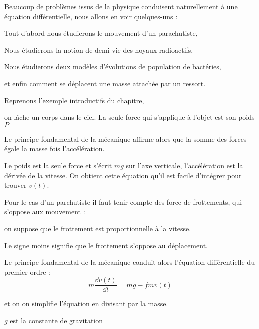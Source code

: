 







\debuttexte


\diapo

Beaucoup de problèmes issus de la physique conduisent 
naturellement à une équation différentielle, nous allons
en voir quelques-uns :

\change

\change
Tout d'abord nous étudierons le mouvement d'un parachutiste,

\change
Nous étudierons la notion de demi-vie des noyaux radioactifs,

\change
Nous étudierons deux modèles d'évolutions de population de bactéries,

\change
et enfin comment se déplacent une masse attachée par un ressort.


\diapo

Reprenons l'exemple introductifs du chapitre,

on lâche un corps dans le ciel.
La seule force qui s'applique à l'objet est son poids $P$

\change
Le principe fondamental de la mécanique affirme alors que 
la somme des forces égale la masse fois l’accélération.

Le poids est la seule force et s'écrit $mg$ sur l'axe verticale,
l'accélération est la dérivée de la vitesse. On obtient
cette équation qu'il est facile d'intégrer pour trouver $v(t)$.

\change
Pour le cas d'un parchutiste il faut tenir compte des force de frottements,
qui s'oppose aux mouvement : 

\change
on suppose que le frottement est proportionnelle à la vitesse.

Le signe moins signifie que le frottement s'oppose au déplacement.

Le principe fondamental de la mécanique
conduit alors l'équation différentielle du premier ordre :
$$m\frac{\dd v(t)}{\dd t}= mg - fm v(t)$$


\change
et on on simplifie l'équation en divisant par la masse.

\change
$g$ est la constante de gravitation


